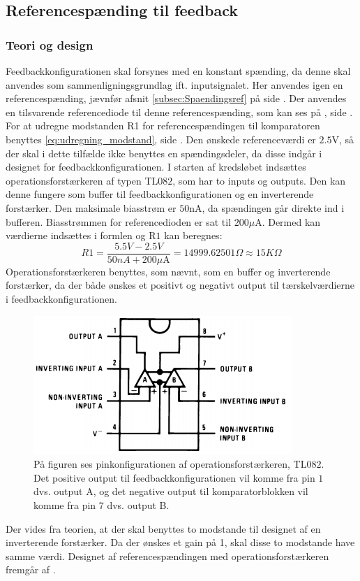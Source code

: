 \subsection{Referencespænding til feedback}\label{subsec:Spaendingsref_Komparator}
\subsubsection{Teori og design}
Feedbackkonfigurationen skal forsynes med en konstant spænding, da denne skal anvendes som sammenligningsgrundlag ift. inputsignalet. Her anvendes igen en referencespænding, jævnfør afsnit \ref{subsec:Spaendingsref} på side \pageref{subsec:Spaendingsref}. Der anvendes en tilsvarende referencediode til denne referencespænding, som kan ses på , side \pageref{subsec:Spaendingsref}. \\
For at udregne modstanden R1 for referencespændingen til komparatoren benyttes \eqref{eq:udregning_modstand}, side \pageref{eq:udregning_modstand}. Den ønskede referenceværdi er $2.5$V, så der skal i dette tilfælde ikke benyttes en spændingsdeler, da disse indgår i designet for feedbackkonfigurationen. I starten af kredsløbet indsættes operationsforstærkeren af typen TL$082$, som har to inputs og outputs. \cite{Corporation2013} Den kan denne fungere som buffer til feedbackkonfigurationen og en inverterende forstærker. \cite{Schaumann2014} Den maksimale biasstrøm er $50$nA, da spændingen går direkte ind i bufferen. Biasstrømmen for referencedioden er sat til $200\mu$A. Dermed kan værdierne indsættes i formlen og R$1$ kan beregnes:
\begin{equation}
R1 = \frac{5.5V-2.5V}{50nA + 200\mu\text{A}} = 14999.62501\Omega \approx 15K\Omega 
\end{equation} 
Operationsforstærkeren benyttes, som nævnt, som en buffer og inverterende forstærker, da der både ønskes et positivt og negativt output til tærskelværdierne i feedbackkonfigurationen.
\begin{figure}[H]
	\centering
	\includegraphics[scale=0.8]{figures/cProblemloesning/TL082.PNG}
	\caption{På figuren ses pinkonfigurationen af operationsforstærkeren, TL$082$. Det positive output til feedbackkonfigurationen vil komme fra pin $1$ dvs. output A, og det negative output til komparatorblokken vil komme fra pin $7$ dvs. output B. \cite{Corporation2013}}
	\label{fig:TL082}
\end{figure}
\noindent Der vides fra teorien, at der skal benyttes to modstande til designet af en inverterende forstærker. Da der ønskes et gain på 1, skal disse to modstande have samme værdi. \cite{Nilsson2011} Designet af referencespændingen med operationsforstærkeren fremgår af .

